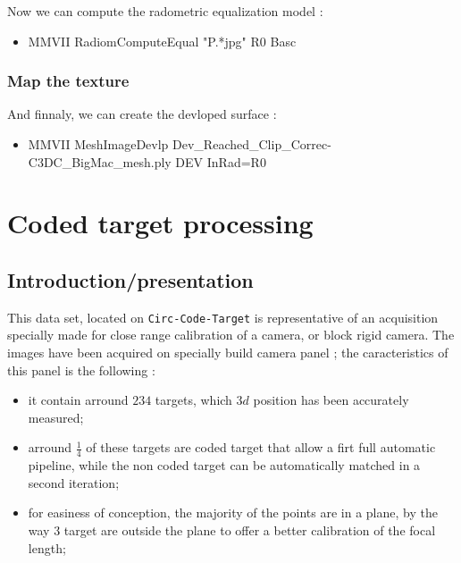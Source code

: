 Now we can compute the radometric equalization model :

\begin{itemize}
     \item {MMVII RadiomComputeEqual "P.*jpg" R0 Basc}
\end{itemize}



\subsubsection{Map the texture}

And finnaly, we can create the devloped surface :


\begin{itemize}
	\item {MMVII MeshImageDevlp Dev\_Reached\_Clip\_Correc-C3DC\_BigMac\_mesh.ply  DEV InRad=R0}
\end{itemize}



\section{Coded target processing}


\subsection{Introduction/presentation}

This data set, located on {\tt Circ-Code-Target} is representative of an acquisition specially made for close 
range calibration of a camera, or block rigid camera.  The images have been
acquired on specially build camera panel ; the caracteristics of this panel
is the following :
 

\begin{itemize}
     \item it contain arround $234$ targets, which $3d$ position has been accurately measured;

     \item arround $\frac{1}{4}$ of these targets are coded target that allow a firt full automatic pipeline,
           while the non coded target can  be automatically matched in a second iteration;

     \item for easiness of conception,  the majority of the points are in a plane, by the way $3$ target
           are outside the plane  to offer a better calibration of the focal length;
\end{itemize}


